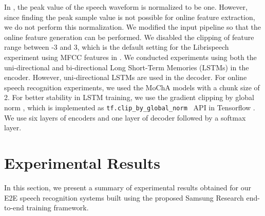 \documentclass[a4paper]{article}
\begin{document}
In \cite{a_zeyer_interspeech_2018_00}, the peak value of the speech 
waveform is normalized to be one. However, since finding the peak sample value 
is not possible for online feature extraction, we do not perform this
normalization. We modified the input pipeline
so that the online feature generation can be performed. We disabled the 
clipping of feature range between -3 and 3, which is the default 
setting for the Librispeech experiment using MFCC 
features in \cite{a_zeyer_interspeech_2018_00}. 
We conducted experiments using both the 
uni-directional and bi-directional Long Short-Term Memories (LSTMs)
\cite{S_Hochreiter_neural_computation_1997_00} in the encoder.
However, uni-directional LSTMs are used in the decoder.
For online speech recognition experiments, we used the
MoChA models \cite{c_chiu_iclr_2018_00} with a chunk size of 2.
 For better stability in LSTM training, we use the gradient clipping by  
global norm \cite{r_pascanu_icml_2013}, which is implemented as  
{\tt tf.clip\_by\_global\_norm } API in Tensorflow  \cite{m_abadi_usenix_2016}.
We use six layers of encoders and one layer of decoder followed by a softmax
layer.



%
%
%
\section{Experimental Results}
\label{sec:experimental_results}
%
In this section, we present a summary of experimental results obtained
for our E2E speech recognition systems built using the proposed
Samsung Research end-to-end training framework.
\end{document}
